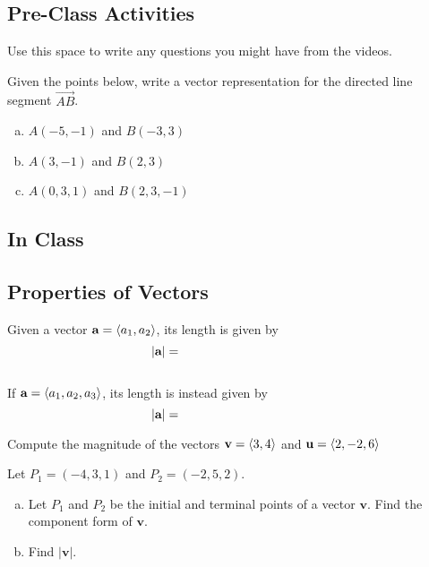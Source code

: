 \documentclass[notes]{subfiles}
\begin{document}
	\subsection*{Pre-Class Activities}
		\begin{ex}
			Use this space to write any questions you might have from the videos.
		\end{ex}
			
		\begin{ex}
			Given the points below, write a vector representation for the directed line segment $\overrightarrow{AB}$.
			\begin{enumerate}[(a)]
				\item $A(-5,-1)$ and $B(-3,3)$
					
				\item $A(3,-1)$ and $B(2,3)$
					
				\item $A(0,3,1)$ and $B(2,3,-1)$
			\end{enumerate}
		\end{ex}
			\newpage
			
	\subsection*{In Class}
	\subsection*{Properties of Vectors}
		\begin{rmk}
			Given a vector $\textbf{a} = \left\langle a_1,a_2\right\rangle$, its length is given by\\[15pt]
				\[|\textbf{a}| = \hspace{1.5in}\]
				\\[10pt]
			If $\textbf{a} = \left\langle a_1,a_2,a_3\right\rangle$, its length is instead given by\\[15pt]
				\[|\textbf{a}| = \hspace{1.5in}\]
		\end{rmk}
		
		\begin{ex}
			Compute the magnitude of the vectors $\textbf{v} = \left\langle 3,4\right\rangle$ and $\textbf{u} = \left\langle 2,-2,6\right\rangle$
		\end{ex}
			\vs{1}
		
		\begin{ex}
			Let $P_1 = (-4,3,1)$ and $P_2 = (-2,5,2)$.
			\begin{enumerate}[(a)]
				\item Let $P_1$ and $P_2$ be the initial and terminal points of a vector $\textbf{v}$.  Find the component form of $\textbf{v}$.
					\vs{1}
					
				\item Find $|\textbf{v}|$.
					\vs{1}
			\end{enumerate}
		\end{ex}	
			\newpage
		
\end{document}
